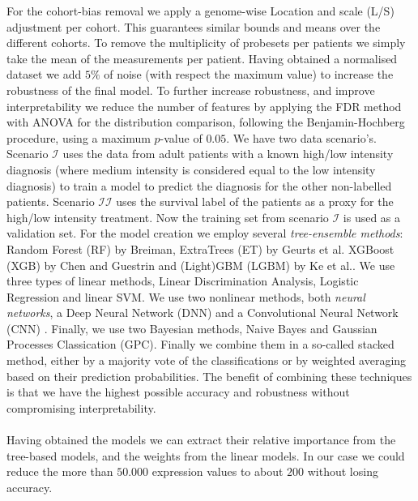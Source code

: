 For the cohort-bias removal we apply a genome-wise Location and scale (L/S) adjustment per cohort. This guarantees similar bounds and means over the different cohorts. To remove the multiplicity of probesets per patients we simply take the mean of the measurements per patient. Having obtained a normalised dataset we add $5\%$ of noise (with respect the maximum value) to increase the robustness of the final model. To further increase robustness, and improve interpretability we reduce the number of features by applying the FDR method with ANOVA for the distribution comparison, following the Benjamin-Hochberg procedure, using a maximum $p$-value of $0.05$. 
%
We have two data scenario's. Scenario $\mathcal{I}$ uses the data from adult patients with a known high/low intensity diagnosis (where 
medium intensity is considered equal to the low intensity diagnosis) to train a model to predict the diagnosis for the other non-labelled patients.
Scenario $\mathcal{II}$ uses the survival label of the patients as a proxy for the high/low intensity treatment. Now the training set from scenario
$\mathcal{I}$ is used as a validation set.
%
For the model creation we employ several \textit{tree-ensemble methods}: Random Forest (RF) by Breiman\cite{Breiman2001}, ExtraTrees (ET) by Geurts et al.\cite{Geurts2006} 
XGBoost (XGB) by Chen and Guestrin\cite{Chen2016} and (Light)GBM (LGBM) by Ke et al.\cite{Ke2017}. 
We use three types of linear methods, Linear Discrimination Analysis, Logistic Regression and linear SVM.
We use two nonlinear methods, both \textit{neural networks}, a Deep Neural Network (DNN) \cite{lecun2015deep} and a Convolutional Neural Network (CNN) \cite{Lecun98}.
Finally, we use two Bayesian methods, Naive Bayes and Gaussian Processes Classication (GPC).
%
Finally we combine them in a so-called stacked method, either by a majority vote of the classifications or by weighted averaging based on their prediction probabilities. The benefit of combining these techniques is that we have the highest possible accuracy and robustness without compromising interpretability. \\ \\
%
Having obtained the models we can extract their relative importance from the tree-based models, and the weights from the linear models. In our case we could reduce the more than $50.000$ expression values to about $200$ without losing accuracy. 

